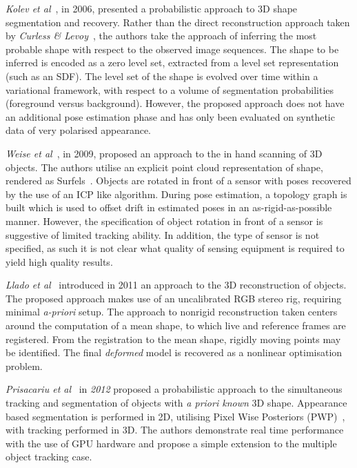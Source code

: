 \textit{Kolev et al}~\cite{Kolev2006}, in 2006, presented a probabilistic approach to 3D shape 
segmentation and recovery. Rather than the direct reconstruction approach taken by 
\textit{Curless \& Levoy}~\cite{Curless1996}, the authors take the approach of inferring the most 
probable shape with respect to the observed image sequences. The shape to be inferred is encoded as a 
zero level set, extracted from a level set representation (such as an SDF). The level set of the shape is 
evolved over time within a variational framework, with respect to a volume of segmentation 
probabilities (foreground versus background). However, the proposed approach does not have an additional pose 
estimation phase and has only been evaluated on synthetic data of very polarised appearance.

\textit{Weise et al}~\cite{Weise2009}, in 2009, proposed an approach to the in hand scanning of 3D objects. 
The authors utilise an explicit point cloud representation of shape, rendered as Surfels~\cite{Pfister2000}. 
Objects are rotated in front of a sensor with poses recovered by the use of an ICP like algorithm. During 
pose estimation, a topology graph is built which is used to offset drift in estimated poses in an 
as-rigid-as-possible~\cite{Igarashi2005} manner. However, the specification of object rotation in front of 
a sensor is suggestive of limited tracking ability. In addition, the type of sensor is not specified, 
as such it is not clear what quality of sensing equipment is required to yield high quality results.

\textit{Llado et al}~\cite{Llado2011} introduced in 2011 an approach to the 3D reconstruction of 
 objects. The proposed approach makes use of an uncalibrated RGB stereo rig, requiring 
minimal \textit{a-priori} setup. The approach to nonrigid reconstruction taken centers around the computation 
of a mean shape, to which live and reference frames are registered. From the registration to the mean shape, 
rigidly moving points may be identified. The final \textit{deformed} model is recovered as a nonlinear 
optimisation problem. 

\textit{Prisacariu et al}~\cite{Prisacariu2012} in \textit{2012} proposed a probabilistic approach to the 
simultaneous tracking and segmentation of objects with \textit{a priori known} 3D shape. Appearance based 
segmentation is performed in 2D, utilising Pixel Wise Posteriors (PWP)~\cite{Bibby2008}, with tracking performed 
in 3D. The authors demonstrate real time performance with the use of GPU hardware and propose a simple extension 
to the multiple object tracking case.

